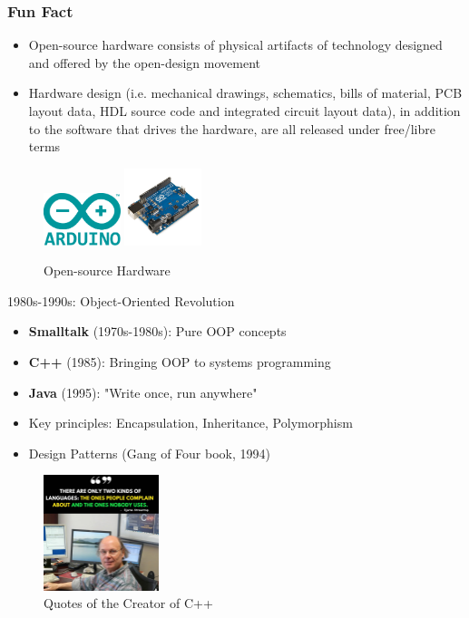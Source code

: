 \documentclass{beamer}
\begin{document}
\begin{frame}[t]
    \frametitle{Fun Fact}
    \begin{itemize}
        \scriptsize
        \item Open-source hardware consists of physical artifacts of technology designed and offered by the open-design movement
        \item Hardware design (i.e. mechanical drawings, schematics, bills of material, PCB layout data, HDL source code and integrated circuit layout data), in addition to the software that drives the hardware, are all released under free/libre terms
    \end{itemize}
    \begin{figure}
        \includegraphics[width=0.2\textwidth]{images/arduino.png}
        \includegraphics[width=0.2\textwidth]{images/Arduino_Uno.jpg}
    \caption{Open-source Hardware}
    \end{figure}
    
    
\end{frame}
\begin{frame}[t]{1980s-1990s: Object-Oriented Revolution}
\begin{itemize}
    \item \textbf{Smalltalk} (1970s-1980s): Pure OOP concepts
    \item \textbf{C++} (1985): Bringing OOP to systems programming
    \item \textbf{Java} (1995): "Write once, run anywhere"
    \item Key principles: Encapsulation, Inheritance, Polymorphism
    \item Design Patterns (Gang of Four book, 1994)
\end{itemize}

\begin{figure}
    \includegraphics[width=0.3\textwidth]{images/cpp.jpeg}
    \caption{Quotes of the Creator of C++}
\end{figure}

\end{frame}
\end{document}
